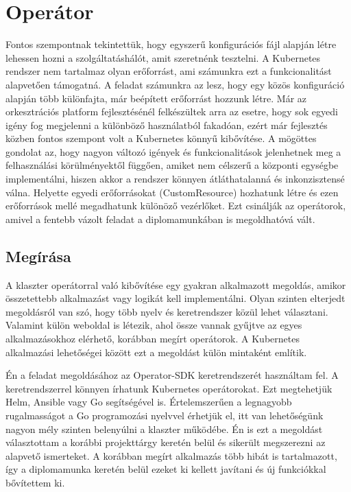 \section{Operátor}
Fontos szempontnak tekintettük, hogy egyszerű konfigurációs fájl alapján létre lehessen hozni a szolgáltatáshálót, amit szeretnénk tesztelni.
A Kubernetes rendszer nem tartalmaz olyan erőforrást, ami számunkra ezt a funkcionalitást alapvetően támogatná.
A feladat számunkra az lesz, hogy egy közös konfiguráció alapján több különfajta, már beépített erőforrást hozzunk létre.
Már az orkesztrációs platform fejlesztésénél felkészültek arra az esetre, hogy sok egyedi igény fog megjelenni a különböző használatból fakadóan, ezért már fejlesztés közben fontos szempont volt a Kubernetes könnyű kibővítése.
A mögöttes gondolat az, hogy nagyon változó igények és funkcionalitások jelenhetnek meg a felhasználási körülményektől függően, amiket nem célszerű a központi egységbe implementálni, hiszen akkor a rendszer könnyen átláthatalanná és inkonzisztensé válna.
Helyette egyedi erőforrásokat (CustomResource) hozhatunk létre és ezen erőforrások mellé megadhatunk különöző vezérlőket. Ezt csinálják az operátorok, amivel a fentebb vázolt feladat a diplomamunkában is megoldhatóvá vált.

\subsection{Megírása}
A klaszter operátorral való kibővítése egy gyakran alkalmazott megoldás, amikor összetettebb alkalmazást vagy logikát kell implementálni. Olyan szinten elterjedt megoldásról van szó, hogy több nyelv és keretrendszer közül lehet választani\citep{availableOperatorFrameworks}. Valamint külön weboldal is létezik, ahol össze vannak gyűjtve az egyes alkalmazásokhoz elérhető, korábban megírt operátorok.\citep{operatorhub} A Kubernetes alkalmazási lehetőségei között ezt a megoldást külön mintaként említik.\citep{KubernetesPatterns} 

Én a feladat megoldásához az Operator-SDK\citep{operatorSDK} keretrendszerét használtam fel. A keretrendszerrel könnyen írhatunk Kubernetes operátorokat. Ezt megtehetjük Helm, Ansible vagy Go segítségével is. Értelemszerűen a legnagyobb rugalmasságot a Go programozási nyelvvel érhetjük el, itt van lehetőségünk nagyon mély szinten belenyúlni a klaszter működébe. Én is ezt a megoldást választottam a korábbi projekttárgy keretén belül és sikerült megszerezni az alapvető ismerteket. A korábban megírt alkalmazás több hibát is tartalmazott, így a diplomamunka keretén belül ezeket ki kellett javítani és új funkciókkal bővítettem ki.

